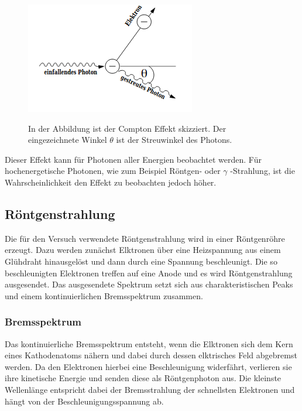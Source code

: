 \documentclass[titlepage = firstcover]{scrartcl}
\begin{document}
        \FloatBarrier
        \begin{figure}[h]
            \centering
            \caption{In der Abbildung ist der Compton Effekt skizziert. Der eingezeichnete Winkel $\theta$ ist der Streuwinkel des Photons.}
            \includegraphics{SkizzeCompton.png}
            \label{fig:SkizzeCompton}
        \end{figure}
        \FloatBarrier
        \noindent

        Dieser Effekt kann für Photonen aller Energien beobachtet werden. Für hochenergetische Photonen, wie zum Beispiel Röntgen- oder $\gamma$ -Strahlung,
        ist die Wahrscheinlichkeit den Effekt zu beobachten jedoch höher.  

        \subsection{Röntgenstrahlung}
        Die für den Versuch verwendete Röntgenstrahlung wird in einer Röntgenröhre erzeugt. Dazu werden zunächst Elktronen über eine Heizspannung aus einem
        Glühdraht hinausgelöst und dann durch eine Spannung beschleunigt. Die so beschleunigten Elektronen treffen auf eine Anode und es wird Röntgenstrahlung
        ausgesendet. Das ausgesendete Spektrum setzt sich aus charakteristischen Peaks und einem kontinuierlichen Bremsspektrum zusammen. 
        
            \subsubsection*{Bremsspektrum}
                Das kontinuierliche Bremsspektrum entsteht, wenn die Elktronen sich dem Kern eines Kathodenatoms nähern und dabei durch dessen elktrisches 
                Feld abgebremst werden. Da den Elektronen hierbei eine Beschleunigung widerfährt, verlieren sie ihre kinetische Energie und senden diese als 
                Röntgenphoton aus. Die kleinste Wellenlänge entspricht dabei der Bremsstrahlung der schnellsten Elektronen und hängt von der 
                Beschleunigungsspannung ab.
                
\end{document}
